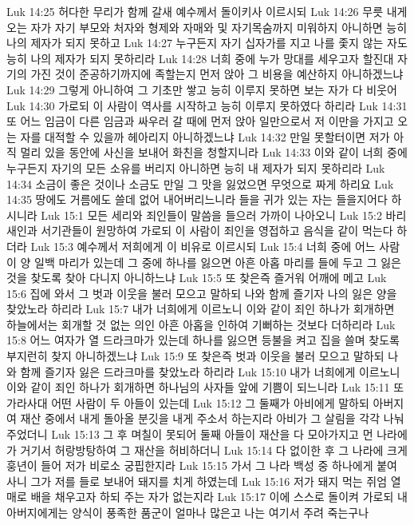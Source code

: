 Luk 14:25  허다한 무리가 함께 갈새 예수께서 돌이키사 이르시되
Luk 14:26  무릇 내게 오는 자가 자기 부모와 처자와 형제와 자매와 및 자기목숨까지 미워하지 아니하면 능히 나의 제자가 되지 못하고
Luk 14:27  누구든지 자기 십자가를 지고 나를 좇지 않는 자도 능히 나의 제자가 되지 못하리라
Luk 14:28  너희 중에 누가 망대를 세우고자 할진대 자기의 가진 것이 준공하기까지에 족할는지 먼저 앉아 그 비용을 예산하지 아니하겠느냐
Luk 14:29  그렇게 아니하여 그 기초만 쌓고 능히 이루지 못하면 보는 자가 다 비웃어
Luk 14:30  가로되 이 사람이 역사를 시작하고 능히 이루지 못하였다 하리라
Luk 14:31  또 어느 임금이 다른 임금과 싸우러 갈 때에 먼저 앉아 일만으로서 저 이만을 가지고 오는 자를 대적할 수 있을까 헤아리지 아니하겠느냐
Luk 14:32  만일 못할터이면 저가 아직 멀리 있을 동안에 사신을 보내어 화친을 청할지니라
Luk 14:33  이와 같이 너희 중에 누구든지 자기의 모든 소유를 버리지 아니하면 능히 내 제자가 되지 못하리라
Luk 14:34  소금이 좋은 것이나 소금도 만일 그 맛을 잃었으면 무엇으로 짜게 하리요
Luk 14:35  땅에도 거름에도 쓸데 없어 내어버리느니라 들을 귀가 있는 자는 들을지어다 하시니라
Luk 15:1  모든 세리와 죄인들이 말씀을 들으러 가까이 나아오니
Luk 15:2  바리새인과 서기관들이 원망하여 가로되 이 사람이 죄인을 영접하고 음식을 같이 먹는다 하더라
Luk 15:3  예수께서 저희에게 이 비유로 이르시되
Luk 15:4  너희 중에 어느 사람이 양 일백 마리가 있는데 그 중에 하나를 잃으면 아흔 아홉 마리를 들에 두고 그 잃은 것을 찾도록 찾아 다니지 아니하느냐
Luk 15:5  또 찾은즉 즐거워 어깨에 메고
Luk 15:6  집에 와서 그 벗과 이웃을 불러 모으고 말하되 나와 함께 즐기자 나의 잃은 양을 찾았노라 하리라
Luk 15:7  내가 너희에게 이르노니 이와 같이 죄인 하나가 회개하면 하늘에서는 회개할 것 없는 의인 아흔 아홉을 인하여 기뻐하는 것보다 더하리라
Luk 15:8  어느 여자가 열 드라크마가 있는데 하나를 잃으면 등불을 켜고 집을 쓸며 찾도록 부지런히 찾지 아니하겠느냐
Luk 15:9  또 찾은즉 벗과 이웃을 불러 모으고 말하되 나와 함께 즐기자 잃은 드라크마를 찾았노라 하리라
Luk 15:10  내가 너희에게 이르노니 이와 같이 죄인 하나가 회개하면 하나님의 사자들 앞에 기쁨이 되느니라
Luk 15:11  또 가라사대 어떤 사람이 두 아들이 있는데
Luk 15:12  그 둘째가 아비에게 말하되 아버지여 재산 중에서 내게 돌아올 분깃을 내게 주소서 하는지라 아비가 그 살림을 각각 나눠 주었더니
Luk 15:13  그 후 며칠이 못되어 둘째 아들이 재산을 다 모아가지고 먼 나라에 가 거기서 허랑방탕하여 그 재산을 허비하더니
Luk 15:14  다 없이한 후 그 나라에 크게 훙년이 들어 저가 비로소 궁핍한지라
Luk 15:15  가서 그 나라 백성 중 하나에게 붙여 사니 그가 저를 들로 보내어 돼지를 치게 하였는데
Luk 15:16  저가 돼지 먹는 쥐엄 열매로 배을 채우고자 하되 주는 자가 없는지라
Luk 15:17  이에 스스로 돌이켜 가로되 내 아버지에게는 양식이 풍족한 품군이 얼마나 많은고 나는 여기서 주려 죽는구나
